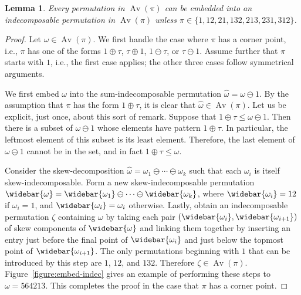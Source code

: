 \documentclass[10pt]{article}
\theoremstyle{plain}
\newtheorem{lemma}[theorem]{Lemma}
\newcommand{\Av}{\operatorname{Av}}
\begin{document}
\begin{lemma}
	\label{lemma:embed-indec}
	Every permutation in $\Av(\pi)$ can be embedded into an indecomposable permutation in $\Av(\pi)$ unless $\pi \in \{1, 12, 21, 132, 213, 231, 312\}$.
\end{lemma}
\begin{proof}
	Let $\omega \in \Av(\pi)$. We first handle the case where $\pi$ has a corner point, i.e., $\pi$ has one of the forms $1 \oplus \tau$, $\tau \oplus 1$, $1 \ominus \tau$, or $\tau \ominus 1$. Assume further that $\pi$ starts with $1$, i.e., the first case applies; the other three cases follow symmetrical arguments.
	
	We first embed $\omega$ into the sum-indecomposable permutation $\hat{\omega} = \omega \ominus 1$. By the assumption that $\pi$ has the form $1 \oplus \tau$, it is clear that $\hat{\omega} \in \Av(\pi)$. Let us be explicit, just once, about this sort of remark. Suppose that $1 \oplus \tau \leq \omega \ominus 1$. Then there is a subset of $\omega \ominus 1$ whose elements have pattern $1 \oplus \tau$. In particular, the leftmost element of this subset is its least element. Therefore, the last element of $\omega \ominus 1$ cannot be in the set, and in fact $1 \oplus \tau \leq \omega$.
	
	Consider the skew-decomposition $\hat{\omega} = \omega_1 \ominus \cdots \ominus \omega_k$ such that each $\omega_i$ is itself skew-indecomposable. Form a new skew-indecomposable permutation $\widebar{\omega} = \widebar{\omega_1} \ominus \cdots \ominus \widebar{\omega_k}$, where $\widebar{\omega_i} = 12$ if $\omega_i = 1$, and $\widebar{\omega_i} = \omega_i$ otherwise. Lastly, obtain an indecomposable permutation $\zeta$ containing $\omega$ by taking each pair $(\widebar{\omega_i}, \widebar{\omega_{i+1}})$ of skew components of $\widebar{\omega}$ and linking them together by inserting an entry just before the final point of $\widebar{\omega_i}$ and just below the topmost point of $\widebar{\omega_{i+1}}$. The only permutations beginning with $1$ that can be introduced by this step are $1$, $12$, and $132$. Therefore $\zeta \in \Av(\pi)$. Figure~\ref{figure:embed-indec} gives an example of performing these steps to $\omega = 564213$. This completes the proof in the case that $\pi$ has a corner point.
	

\end{proof}
\end{document}
